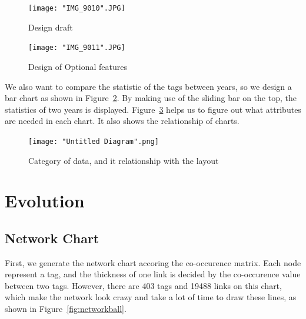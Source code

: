 \documentclass{report}
\numberwithin{figure}{section}
\begin{document}
\begin{figure}
\begin{center}
\texttt{[image: "IMG\_9010".JPG]}
\caption{Design draft}
\label{fig:design1}
\end{center}
\end{figure}

\begin{figure}
\begin{center}
\texttt{[image: "IMG\_9011".JPG]}
\caption{Design of Optional features}
\label{fig:design2}
\end{center}
\end{figure}

\quad We also want to compare the statistic of the tags between years, so we design a bar chart as shown in Figure~\ref{fig:design2}. By making use of the sliding bar on the top, the statistics of two years is displayed. Figure~\ref{fig:data} helps us to figure out what attributes are needed in each chart. It also shows the relationship of charts.  

\begin{figure}
\begin{center}
\texttt{[image: "Untitled Diagram".png]}
\caption{Category of data, and it relationship with the layout}
\label{fig:data}
\end{center}
\end{figure}

\section{Evolution}

\subsection{Network Chart}
\quad First, we generate the network chart accoring the co-occurence matrix. Each node represent a tag, and the thickness of one link is decided by the co-occurence value between two tags. However, there are 403 tags and 19488 links on this chart, which make the network look crazy and take a lot of time to draw these lines, as shown in Figure~\ref{fig:networkball}. 
\end{document}
